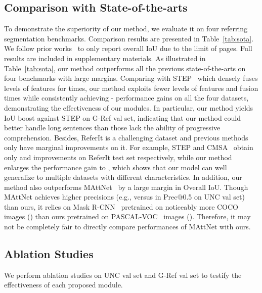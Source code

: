 \documentclass[10pt,twocolumn,letterpaper]{article}
\begin{document}
\subsection{Comparison with State-of-the-arts}
To demonstrate the superiority of our method, we evaluate it on four referring segmentation benchmarks. 
Comparison results are presented in Table~\ref{tab:sota}. 
We follow prior works~\cite{ye2019cross}\cite{chen2019see} to only report overall IoU due to the limit of pages. 
Full results are included in supplementary materials. 
As illustrated in Table~\ref{tab:sota}, our method outperforms all the previous state-of-the-arts on 
four benchmarks with large margins. 
Comparing with STEP~\cite{chen2019see} which densely fuses  levels of features for  times, our method 
exploits fewer levels of features and fusion times while consistently achieving - performance gains 
on all the four datasets, demonstrating the effectiveness of our modules. 
In particular, our method yields  IoU boost against STEP on G-Ref val set, indicating that our method could better handle long sentences than those lack the ability of progressive comprehension. 
Besides, ReferIt is a challenging dataset and previous methods only have marginal improvements on it. For example, 
STEP and CMSA~\cite{ye2019cross} obtain only  and  improvements on 
ReferIt test set respectively, while our method enlarges the performance gain to , 
which shows that our model can well generalize to multiple datasets with different characteristics. 
In addition, our method also outperforms MAttNet~\cite{yu2018mattnet} by a large margin in Overall IoU. 
Though MAttNet achieves higher precisions (e.g.,  versus  in Prec@0.5 on UNC val set) than ours, it relies on Mask R-CNN~\cite{he2017mask} pretrained on noticeably more COCO~\cite{lin2014microsoft} images () than ours pretrained on PASCAL-VOC~\cite{everingham2010pascal} images (). Therefore, it may not be completely fair to directly compare performances of MAttNet with ours.

\subsection{Ablation Studies}
We perform ablation studies on UNC val set and G-Ref val set to testify the effectiveness of each proposed module.
\end{document}
